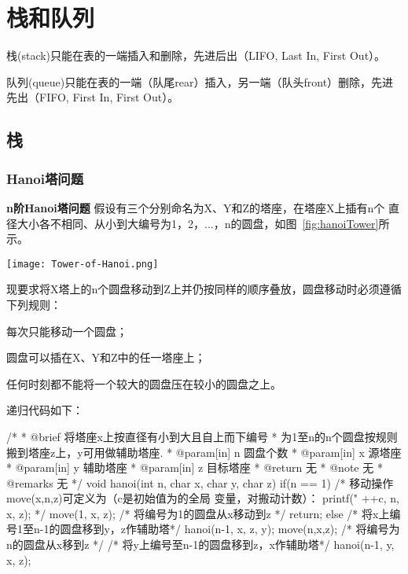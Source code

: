 \chapter{栈和队列}

栈(stack)只能在表的一端插入和删除，先进后出（LIFO, Last In, First Out）。

队列(queue)只能在表的一端（队尾rear）插入，另一端（队头front）删除，先进先出（FIFO, First In, First Out）。

\section{栈} %


\subsection{Hanoi塔问题}

\textbf{n阶Hanoi塔问题} 假设有三个分别命名为X、Y和Z的塔座，在塔座X上插有n个
直径大小各不相同、从小到大编号为1，2，...，n的圆盘，如图~\ref{fig:hanoiTower}所示。

\begin{center}
\texttt{[image: Tower-of-Hanoi.png]}\\
\label{fig:hanoiTower}
\end{center}


现要求将X塔上的n个圆盘移动到Z上并仍按同样的顺序叠放，圆盘移动时必须遵循下列规则：
\begindot
\item 每次只能移动一个圆盘；
\item 圆盘可以插在X、Y和Z中的任一塔座上；
\item 任何时刻都不能将一个较大的圆盘压在较小的圆盘之上。
\myenddot

递归代码如下：
\begin{Codex}[label=hanoi.c]
/*
 * @brief 将塔座x上按直径有小到大且自上而下编号
 * 为1至n的n个圆盘按规则搬到塔座z上，y可用做辅助塔座.
 * @param[in] n 圆盘个数
 * @param[in] x 源塔座
 * @param[in] y 辅助塔座
 * @param[in] z 目标塔座
 * @return 无
 * @note 无
 * @remarks 无
 */
void hanoi(int n, char x, char y, char z)
{
    if(n ==  1) {
        /* 移动操作move(x,n,z)可定义为（c是初始值为的全局
           变量，对搬动计数）：
           printf("%
                                        ++c, n, x, z);
        */
        move(1, x, z); /* 将编号为1的圆盘从x移动到z */
        return;
    } else {
        /* 将x上编号1至n-1的圆盘移到y，z作辅助塔*/
        hanoi(n-1, x, z, y); 
        move(n,x,z);  /* 将编号为n的圆盘从x移到z */
        /* 将y上编号至n-1的圆盘移到z，x作辅助塔*/
        hanoi(n-1, y, x, z); 
    }
}
\end{Codex}

